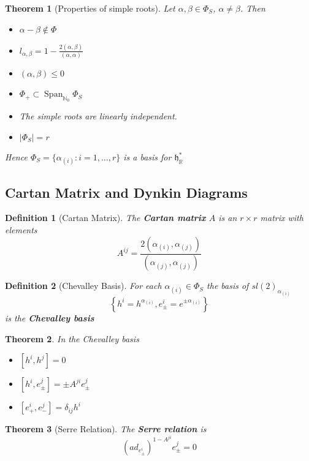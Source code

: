 \documentclass{article}
\newtheorem{theorem}{Theorem}[subsection]
\newtheorem{definition}{Definition}[subsection]
\DeclareMathOperator{\spn}{Span}
\newcommand{\bam}[1]{\textbf{#1}}
\newcommand{\mf}[1]{\mathfrak{#1}}
\newcommand{\mbb}[1]{\mathbb{#1}}
\newcommand{\comm}[2][]{\left[ #1, #2 \right]}
\newcommand{\set}[1]{\lbrace #1 \rbrace}
\begin{document}
\begin{theorem}[Properties of simple roots]
Let $\alpha,\beta\in\Phi_S$, $\alpha\neq\beta$. Then
\begin{itemize}
    \item $\alpha-\beta\notin\Phi$
    \item $l_{\alpha,\beta}=1-\frac{2(\alpha,\beta)}{(\alpha,\alpha)}$
    \item $(\alpha,\beta)\leq0$
    \item $\Phi_+\subset\spn_{\mbb{N}_0}\Phi_S$
    \item The simple roots are linearly independent.
    \item $|\Phi_S|=r$
\end{itemize}
Hence $\Phi_S=\set{  \alpha_{(i)} : i=1,\dots,r  }$ is a basis for $\mf{h}^\ast_\mbb{R}$
\end{theorem}

\subsection{Cartan Matrix and Dynkin Diagrams}

\begin{definition}[Cartan Matrix]
The \bam{Cartan matrix} $A$ is an $r \times r$ matrix with elements 
\[
A^{ij}=\frac{2(\alpha_{(i)},\alpha_{(j)})}{(\alpha_{(j)},\alpha_{(j)})}
\]
\end{definition}

\begin{definition}[Chevalley Basis]
For each $\alpha_{(i)}\in\Phi_S$ the basis of $sl(2)_{\alpha_{(i)}}$
\[
\left\{ h^i=h^{\alpha_{(i)}}, e^i_\pm=e^{\pm\alpha_{(i)}} \right\}
\]
is the \bam{Chevalley basis}
\end{definition}

\begin{theorem}
In the Chevalley basis
\begin{itemize}
    \item $\comm[h^i]{h^j}=0$
    \item $\comm[h^i]{e^j_\pm}=\pm A^{ji} e^j_\pm$
    \item $\comm[e^i_+]{e^j_-}=\delta_{ij} h^i$
\end{itemize}
\end{theorem}

\begin{theorem}[Serre Relation]
The \bam{Serre relation} is 
\[
\left( ad_{e^i_\pm}\right)^{1-A^{ji}} e^j_\pm=0
\]
\end{theorem}
\end{document}
